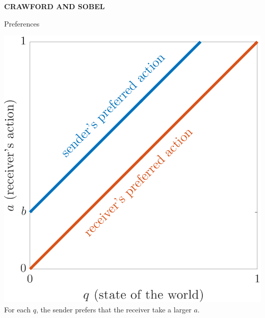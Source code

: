 \documentclass[hyperref={colorlinks=true,linkcolor=blue,citecolor=blue}]{beamer}
\begin{document}
\begin{frame}
\begin{center}
\textbf{CRAWFORD AND SOBEL}
\end{center}
\end{frame}

\begin{frame}{Preferences}
\begin{center}
\includegraphics[scale=.45]{ObjectiveFunctions}\\
For each $q$, the sender prefers that the receiver take a larger $a$. 
\end{center}
\end{frame}
\end{document}

